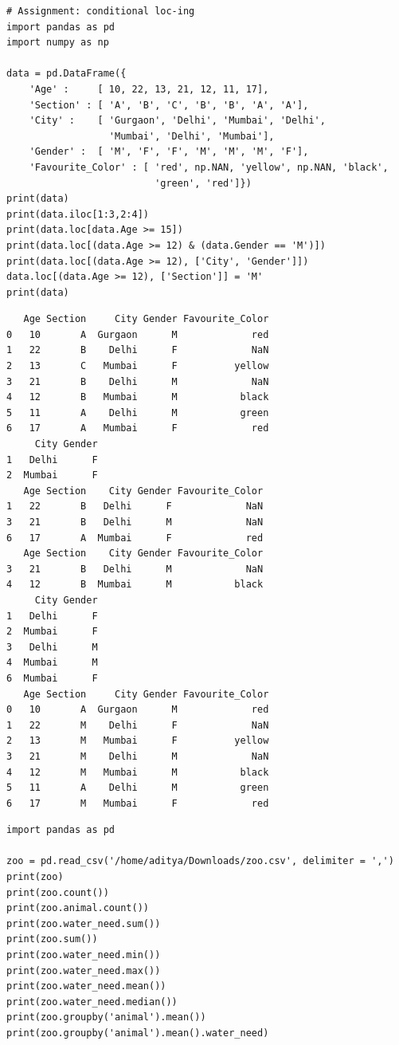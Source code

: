 \documentclass[11pt]{article}
\begin{document}
\begin{verbatim}
# Assignment: conditional loc-ing
import pandas as pd
import numpy as np

data = pd.DataFrame({
    'Age' :     [ 10, 22, 13, 21, 12, 11, 17],
    'Section' : [ 'A', 'B', 'C', 'B', 'B', 'A', 'A'],
    'City' :    [ 'Gurgaon', 'Delhi', 'Mumbai', 'Delhi',
                  'Mumbai', 'Delhi', 'Mumbai'],
    'Gender' :  [ 'M', 'F', 'F', 'M', 'M', 'M', 'F'],
    'Favourite_Color' : [ 'red', np.NAN, 'yellow', np.NAN, 'black',
                          'green', 'red']})
print(data)
print(data.iloc[1:3,2:4])
print(data.loc[data.Age >= 15])
print(data.loc[(data.Age >= 12) & (data.Gender == 'M')])
print(data.loc[(data.Age >= 12), ['City', 'Gender']])
data.loc[(data.Age >= 12), ['Section']] = 'M'
print(data)
\end{verbatim}

\begin{verbatim}
   Age Section     City Gender Favourite_Color
0   10       A  Gurgaon      M             red
1   22       B    Delhi      F             NaN
2   13       C   Mumbai      F          yellow
3   21       B    Delhi      M             NaN
4   12       B   Mumbai      M           black
5   11       A    Delhi      M           green
6   17       A   Mumbai      F             red
     City Gender
1   Delhi      F
2  Mumbai      F
   Age Section    City Gender Favourite_Color
1   22       B   Delhi      F             NaN
3   21       B   Delhi      M             NaN
6   17       A  Mumbai      F             red
   Age Section    City Gender Favourite_Color
3   21       B   Delhi      M             NaN
4   12       B  Mumbai      M           black
     City Gender
1   Delhi      F
2  Mumbai      F
3   Delhi      M
4  Mumbai      M
6  Mumbai      F
   Age Section     City Gender Favourite_Color
0   10       A  Gurgaon      M             red
1   22       M    Delhi      F             NaN
2   13       M   Mumbai      F          yellow
3   21       M    Delhi      M             NaN
4   12       M   Mumbai      M           black
5   11       A    Delhi      M           green
6   17       M   Mumbai      F             red
\end{verbatim}

\begin{verbatim}
import pandas as pd

zoo = pd.read_csv('/home/aditya/Downloads/zoo.csv', delimiter = ',')
print(zoo)
print(zoo.count())
print(zoo.animal.count())
print(zoo.water_need.sum())
print(zoo.sum())
print(zoo.water_need.min())
print(zoo.water_need.max())
print(zoo.water_need.mean())
print(zoo.water_need.median())
print(zoo.groupby('animal').mean())
print(zoo.groupby('animal').mean().water_need)
\end{verbatim}
\end{document}

